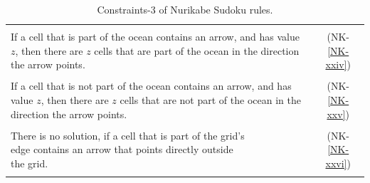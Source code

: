 \begin{table}
    \centering
    \begin{tabular*}{\textwidth}{l @{\extracolsep{\fill}} c}
        \hline
        \\
        \makecell[cl]{If a cell that is part of the ocean contains an arrow,\\
        and has value $z$, then there are $z$ cells that are part\\
        of the ocean in the direction the arrow points.} & (NK-\ref{NK-xxiv})\\
        \\
        \makecell[cl]{If a cell that is not part of the ocean contains an\\
        arrow, and has value $z$, then there are $z$ cells that are\\
        not part of the ocean in the direction the arrow points.} & (NK-\ref{NK-xxv})\\
        \\
        \makecell[cl]{There is no solution, if a cell that is part of the grid's\\
        edge contains an arrow that points directly outside\\
        the grid.} & (NK-\ref{NK-xxvi})\\
        \\
        \hline
    \end{tabular*}
        \caption{Constraints-3 of Nurikabe Sudoku rules.}
    \label{Constraints:NurikabeSudoku3}
\end{table}

